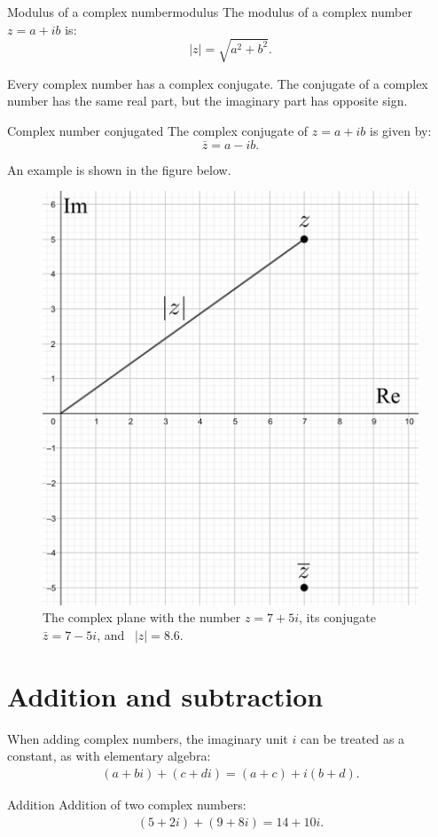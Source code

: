 \begin{definition}{Modulus of a complex number}{modulus}
The modulus of a complex number $z=a+ib$ is:
$$\mid z\mid=\sqrt{a^2+b^2}.$$
\end{definition}
\noindent
Every complex number has a complex conjugate. The conjugate of a complex number has the same real part, but the imaginary part has opposite sign.
\\

\begin{definition}{Complex number conjugated}{}
The complex conjugate of $z=a+ib$ is given by:
$$\bar{z}=a-ib.$$
\end{definition}

\noindent An example is shown in the figure below.  

\begin{figure}[H]
\centering
\includegraphics[scale=0.2]{fig/img/complex_plan}
\caption{The complex plane with the number $z=7+5i$, its conjugate $\bar{z}=7-5i$, and \  $|z|=8.6$.}
\end{figure}


\section{Addition and subtraction}
When adding complex numbers, the imaginary unit $i$ can be treated as a constant, as with elementary algebra:
\begin{align*}
(a + bi) + (c + di) = (a + c) + i(b + d).
\end{align*} 
\begin{example}{Addition}{}
Addition of two complex numbers:
\begin{align*}
(5+2i)+(9+8i)=14+10i.
\end{align*}
\end{example}


